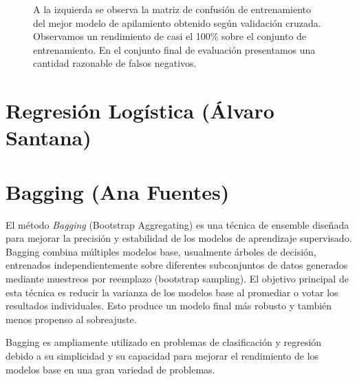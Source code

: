 \documentclass[12pt,letterpaper]{article}
\begin{document}
\begin{figure}[htp]
\centering
{}
\caption{A la izquierda se observa la matriz de confusión de entrenamiento del mejor modelo de apilamiento obtenido según validación cruzada. Observamos un rendimiento de casi el 100\% sobre el conjunto de entrenamiento.
En el conjunto final de evaluación presentamos una cantidad razonable de falsos negativos.}
\label{fig:StackingMatrix}
\end{figure}


\section{Regresión Logística (Álvaro Santana)}
\section{Bagging (Ana Fuentes)}

El método \textit{Bagging} (Bootstrap Aggregating) es una técnica de ensemble diseñada para mejorar la precisión y estabilidad de los modelos de aprendizaje supervisado. Bagging combina múltiples modelos base, usualmente árboles de decisión, entrenados independientemente sobre diferentes subconjuntos de datos generados mediante muestreos por reemplazo (bootstrap sampling). El objetivo principal de esta técnica es reducir la varianza de los modelos base al promediar o votar los resultados individuales. Esto produce un modelo final más robusto y también menos propenso al sobreajuste.

Bagging es ampliamente utilizado en problemas de clasificación y regresión debido a su simplicidad y su capacidad para mejorar el rendimiento de los modelos base en una gran variedad de problemas. \\
\end{document}
